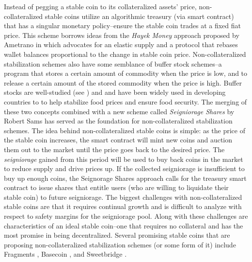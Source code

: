 Instead of pegging a stable coin to its collateralized assets' price, non-collateralized stable coins utilize an algorithmic treasury (via smart contract) that has a singular monetary policy--ensure the stable coin trades at a fixed fiat price. This scheme borrows ideas from the \textit{Hayek Money} approach proposed by Ametrano in \cite{Hayek16} which advocates for an elastic supply and a protocol that rebases wallet balances proportional to the change in stable coin price. Non-collateralized stabilization schemes also have some semblance of buffer stock schemes--a program that stores a certain amount of commodity when the price is low, and to release a certain amount of the stored commodity when the price is high. Buffer stocks are well-studied (see \cite{An13}) and \cite{Ath08} and have been widely used in developing countries to to help stabilize food prices and ensure food security. The merging of these two concepts combined with a new scheme called \textit{Seigniorage Shares} by Robert Sams \cite{Sams15} has served as the foundation for non-collateralized stabilization schemes. The idea behind non-collateralized stable coins is simple: as the price of the stable coin increases, the smart contract will mint new coins and auction them out to the market until the price goes back to the desired price. The \textit{seigniorage} gained from this period will be used to buy back coins in the market to reduce supply and drive prices up. If the collected seigniorage is insufficient to buy up enough coins, the Seignorage Shares approach calls for the treasury smart contract to issue shares that entitle users (who are willing to liquidate their stable coin) to future seigniorage. The biggest challenges with non-collateralized stable coins are that it requires continual growth and is difficult to analyze with respect to safety margins for the seigniorage pool. Along with these challenges are characteristics of an ideal stable coin--one that requires no collateral and has the most promise in being decentralized. Several promising stable coins that are proposing non-collateralized stabilization schemes (or some form of it) include Fragments \cite{frg18}, Basecoin \cite{Base18}, and Sweetbridge \cite{Sweet17}.

